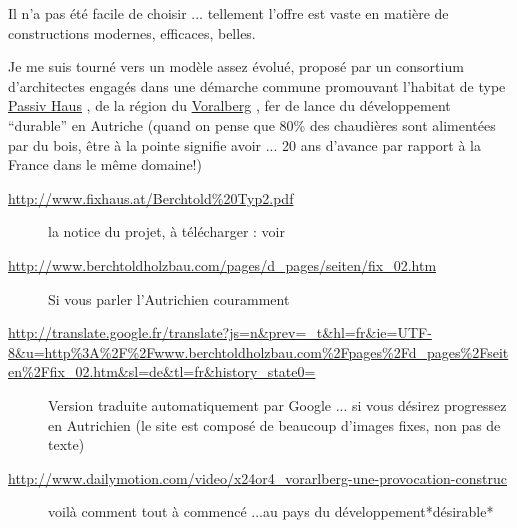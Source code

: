 \documentclass[a4paper,12pt,french]{sphinxmanual}
\begin{document}
Il n'a pas été facile de choisir ... tellement l'offre est vaste en matière de constructions modernes, efficaces, belles.

Je me suis tourné vers un modèle assez évolué, proposé par un consortium d'architectes engagés dans une démarche commune promouvant l'habitat de type \href{http://fr.ekopedia.org/PassivHaus}{Passiv Haus} , de la région du \href{http://fr.wikipedia.org/wiki/Voralberg}{Voralberg} , fer de lance du développement ``durable'' en Autriche (quand on pense que 80\% des chaudières sont alimentées par du bois, être à la pointe signifie avoir ... 20 ans d'avance par rapport à la France dans le même domaine!)



\begin{description}
\item[{\url{http://www.fixhaus.at/Berchtold\%20Typ2.pdf}}] \leavevmode
la notice du projet, à télécharger : voir {\hyperref[init_su+acad/002_demarrage:demarrage\string-init\string-su\string-acad]{}}

\item[{\url{http://www.berchtoldholzbau.com/pages/d\_pages/seiten/fix\_02.htm}}] \leavevmode
Si vous parler l'Autrichien couramment

\item[{\url{http://translate.google.fr/translate?js=n\&prev=\_t\&hl=fr\&ie=UTF-8\&u=http\%3A\%2F\%2Fwww.berchtoldholzbau.com\%2Fpages\%2Fd\_pages\%2Fseiten\%2Ffix\_02.htm\&sl=de\&tl=fr\&history\_state0=}}] \leavevmode
Version traduite automatiquement par Google ... si vous désirez progressez en Autrichien (le site est composé de beaucoup d'images fixes, non pas de texte)

\item[{\url{http://www.dailymotion.com/video/x24or4\_vorarlberg-une-provocation-construc}}] \leavevmode
voilà comment tout à commencé ...au pays du développement*désirable*

\end{description}
\end{document}
